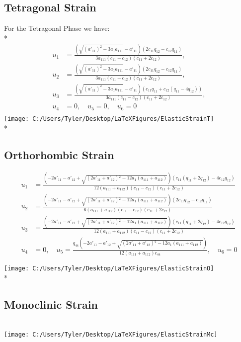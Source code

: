 \documentclass{article}
\begin{document}
\subsection{Tetragonal Strain}
For the Tetragonal Phase we have: \\*
\begin{align}
u_1 &= \frac{\left(\sqrt{(a'_{11})^2-3 a_1 a_{111}}-a'_{11}\right) \left(2 c_{11} q_{12}-c_{12} q_{11}\right)}{3 a_{111} \left(c_{11}-c_{12}\right) \left(c_{11}+2 c_{12}\right)}, \\
u_2 &= \frac{\left(\sqrt{(a'_{11})^2-3 a_1 a_{111}}-a'_{11}\right) \left(2 c_{11} q_{12}-c_{12} q_{11}\right)}{3 a_{111} \left(c_{11}-c_{12}\right) \left(c_{11}+2 c_{12}\right)}, \\
u_3 &= \frac{\left(\sqrt{(a'_{11})^2-3 a_1 a_{111}}-a'_{11}\right) \left(c_{11} q_{11}+c_{12} \left(q_{11}-4 q_{12}\right)\right)}{3 a_{111} \left(c_{11}-c_{12}\right) \left(c_{11}+2 c_{12}\right)}, \\
u_4 &= 0, \quad u_5= 0, \quad u_6=0 \\
\nonumber
\end{align}
\texttt{[image: C:/Users/Tyler/Desktop/LaTeXFigures/ElasticStrainT]}  \\*

\subsection{Orthorhombic Strain}
\begin{align}
u_1 &= \frac{\left(-2 a'_{11}-a'_{12}+\sqrt{\left(2 a'_{11}+a'_{12}\right){}^2-12 a_1 \left(a_{111}+a_{112}\right)}\right) \left(c_{11} \left(q_{11}+2 q_{12}\right)-4 c_{12} q_{12}\right)}{12 \left(a_{111}+a_{112}\right) \left(c_{11}-c_{12}\right) \left(c_{11}+2 c_{12}\right)} \\
u_2 &= \frac{\left(-2 a'_{11}-a'_{12}+\sqrt{\left(2 a'_{11}+a'_{12}\right){}^2-12 a_1 \left(a_{111}+a_{112}\right)}\right) \left(2 c_{11} q_{12}-c_{12} q_{11}\right)}{6 \left(a_{111}+a_{112}\right) \left(c_{11}-c_{12}\right) \left(c_{11}+2 c_{12}\right)} \\
u_3 &= \frac{\left(-2 a'_{11}-a'_{12}+\sqrt{\left(2 a'_{11}+a'_{12}\right){}^2-12 a_1 \left(a_{111}+a_{112}\right)}\right) \left(c_{11} \left(q_{11}+2 q_{12}\right)-4 c_{12} q_{12}\right)}{12 \left(a_{111}+a_{112}\right) \left(c_{11}-c_{12}\right) \left(c_{11}+2 c_{12}\right)} \\
u_4&=0, \quad u_5 = \frac{q_{44} \left(-2 a'_{11}-a'_{12}+\sqrt{\left(2 a'_{11}+a'_{12}\right){}^2-12 a_1 \left(a_{111}+a_{112}\right)}\right)}{12 \left(a_{111}+a_{112}\right) c_{44}}, \quad u_6=0
\end{align}

\texttt{[image: C:/Users/Tyler/Desktop/LaTeXFigures/ElasticStrainO]}  \\*

\subsection{Monoclinic Strain}
\begin{align}
\nonumber
\end{align}

\texttt{[image: C:/Users/Tyler/Desktop/LaTeXFigures/ElasticStrainMc]}
\end{document}
